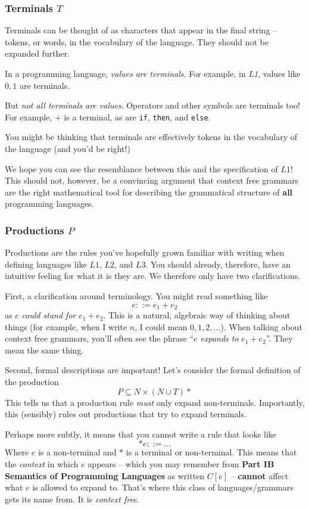 \subsubsection{Terminals $T$}
Terminals can be thought of as characters that appear in the final string -- tokens, or words, in the vocabulary of the language. They should not be expanded further.

In a programming language, \textit{values are terminals}. For example, in \textit{L1}, values like $0, 1$ are terminals. 

But \textit{not all terminals are values}. Operators and other symbols are terminals too! For example, $+$ is a terminal, as are \texttt{if}, \texttt{then}, and \texttt{else}.

You might be thinking that terminals are effectively tokens in the vocabulary of the language (and you'd be right!)

We hope you can see the resemblance between this and the specification of $L1$! This should not, however, be a convincing argument that context free grammars are the right mathematical tool for describing the grammatical structure of \textbf{all} programming languages. 

\subsubsection{Productions $P$}
Productions are the rules you've hopefully grown familiar with writing when defining languages like $L1$, $L2$, and $L3$. You should already, therefore, have an intuitive feeling for what it is they are. We therefore only have two clarifications.

First, a clarification around terminology. You might read something like
\[ e ::= e_1 + e_2 \] 
as $e$ \textit{could stand for} $e_1 + e_2$. This is a natural, algebraic way of thinking about things (for example, when I write $n$, I could mean $0, 1, 2, \ldots$). When talking about context free grammars, you'll often see the phrase ``$e$ \textit{expands to} $e_1 + e_2$''. They mean the same thing.

Second, formal descriptions are important! Let's consider the formal definition of the production
\[P \subseteq N \times (N \cup T)*\]
This tells us that a production rule \textit{must} only expand non-terminals. Importantly, this (sensibly) rules out productions that try to expand terminals.

Perhaps more subtly, it means that you cannot write a rule that looks like 
\[*e ::= \ldots\]
Where $e$ is a non-terminal and $*$ is a terminal or non-terminal. This means that the \textit{context} in which $e$ appears -- which you may remember from \textbf\textsf{Part IB Semantics of Programming Languages} as written $C[e]$ -- \textbf{cannot} affect what $e$ is allowed to expand to. That's where this class of languages/grammars gets its name from. It is \textit{context free}. 

